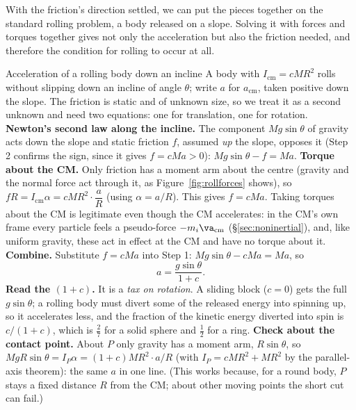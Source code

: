 With the friction's direction settled, we can put the pieces together on the standard rolling problem, a
body released on a slope. Solving it with forces and torques together gives
not only the acceleration but also the friction needed, and therefore the condition for rolling to occur at all.

\begin{derivbox}{Acceleration of a rolling body down an incline}
A body with $I_{\text{cm}}=cMR^2$ rolls without slipping down an incline of angle $\theta$; write $a$ for
$a_{\text{cm}}$, taken positive down the slope. The friction is static and of unknown size, so we treat it
as a second unknown and need two equations: one for translation, one for rotation.
 \textbf{Newton's second law along the incline.} The component $Mg\sin\theta$ of gravity acts down the slope and static friction $f$, assumed
\emph{up} the slope, opposes it (Step 2 confirms the sign, since it gives $f=cMa>0$):
$Mg\sin\theta-f=Ma$.
 \textbf{Torque about the CM.} Only friction has a moment arm about the centre (gravity and the
normal force act through it, as Figure~\ref{fig:rollforces} shows), so $fR=I_{\text{cm}}\alpha=cMR^2\cdot\dfrac{a}{R}$ (using $\alpha=a/R$).
This gives $f=cMa$. Taking torques about the CM is legitimate even though the CM accelerates: in the CM's
own frame every particle feels a pseudo-force $-m_i\va_{\text{cm}}$ (\S\ref{sec:noninertial}), and,
like uniform gravity, these act in effect at the CM and have no torque about it.
 \textbf{Combine.} Substitute $f=cMa$ into Step 1:
$Mg\sin\theta-cMa=Ma$, so
\[
\boxed{a=\frac{g\sin\theta}{1+c}.}
\]
 \textbf{Read the $(1+c)$.} It is a \emph{tax on rotation}. A sliding block ($c=0$) gets the full
$g\sin\theta$; a rolling body must divert some of the released energy into spinning up, so it accelerates less, and
the fraction of the kinetic energy diverted into spin is $c/(1+c)$, which is $\tfrac27$ for a solid
sphere and $\tfrac12$ for a ring.
 \textbf{Check about the contact point.} About $P$ only gravity has a moment arm, $R\sin\theta$,
so $MgR\sin\theta=I_P\alpha=(1+c)MR^2\cdot a/R$ (with $I_P=cMR^2+MR^2$ by the parallel-axis theorem):
the same $a$ in one line. (This works because, for a round
body, $P$ stays a fixed distance $R$ from the CM; about other moving points the short cut can fail.)
\end{derivbox}

\begin{figure}[htbp]
\centering
{}
\end{figure}

